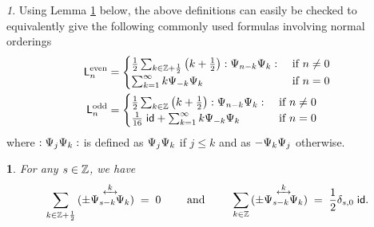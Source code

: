 \documentclass[12pt,oneside,english]{amsart}
\numberwithin{equation}{section}
\numberwithin{figure}{section}
\theoremstyle{plain}
\theoremstyle{plain}
\theoremstyle{plain}
\theoremstyle{plain}
\newtheorem{lem}[thm]{\protect\lemmaname}
\theoremstyle{remark}
\newtheorem{rem}[thm]{\protect\remarkname}
\theoremstyle{definition}
\theoremstyle{plain}
\theoremstyle{plain}
\numberwithin{thm}{section}
\providecommand{\lemmaname}{Lemma}
\providecommand{\remarkname}{Remark}
\providecommand{\lemmaname}{Lemma}
\providecommand{\remarkname}{Remark}
\providecommand{\lemmaname}{Lemma}
\providecommand{\remarkname}{Remark}
\providecommand{\lemmaname}{Lemma}
\providecommand{\remarkname}{Remark}
\begin{document}
\begin{rem}
Using Lemma \ref{lem:no-fermion-square} below, the above definitions
can easily be checked to equivalently give the following commonly 
used formulas involving normal orderings
\begin{align*}
\mathsf{L}_{n}^{\mathrm{even}} & =\begin{cases}
\frac{1}{2}\sum_{k\in\mathbb{Z} +\frac{1}{2}}\left(k+\frac{1}{2}\right):{\Psi}_{n-k
}{\Psi}_{k}: & \text{ if }n\neq0\\
\sum_{k=1}^{\infty}k{\Psi}_{-k}{\Psi}_{k} & \text{ if }n=0
\end{cases}\\
\mathsf{L}_{n}^{\mathrm{odd}} & = \begin{cases}
\frac{1}{2}\sum_{k\in\mathbb{Z}}\left(k+\frac{1}{2}\right):{\Psi}_{n-k
}{\Psi}_{k}: & \text{ if }n\neq0\\
\frac{1}{16} \; \mathsf{id} 
+\sum_{k=1}^{\infty}k{\Psi}_{-k}{\Psi}_{k} & \text{ if } n=0
\end{cases}
\end{align*}
where $:{\Psi}_{j}{\Psi}_{k}:$ is defined as ${\Psi}_{j}{\Psi}_{k}$ 
if $j\leq k$
and as $-{\Psi}_{k}{\Psi}_{j}$ otherwise. 
\end{rem}
\begin{lem}
\label{lem:no-fermion-square}
For any $s\in\mathbb{Z} $, we have 
\begin{align*}
\sum_{k\in\Z  + \frac{1}{2}} \ourforder{\fermmode_{s-k}}{\fermmode_{k}}{k}
\; = \; 0
\qquad \text{ and } \qquad
\sum_{k\in\Z }\ourforder{\fermmode_{s-k}}{\fermmode_{k}}{k}
\; = \; \frac{1}{2} \delta_{s,0} \; \id .
\end{align*}
\end{lem}
\end{document}
